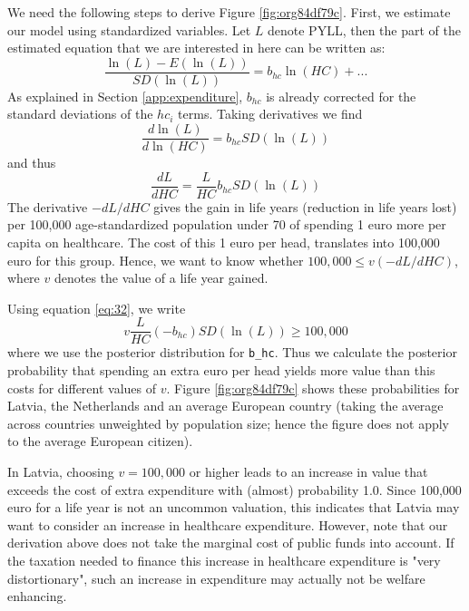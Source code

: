 \documentclass{article}
\begin{document}
We need the following steps to derive Figure \ref{fig:org84df79c}. First, we estimate our model using standardized variables. Let \(L\) denote PYLL, then the part of the estimated equation that we are interested in here can be written as:
\begin{equation}
\label{eq:27}
\frac{\ln(L)-E(\ln(L))}{SD(\ln(L))} = b_{hc} \ln(HC) + ...
\end{equation}
As explained in Section \ref{app:expenditure}, \(b_{hc}\) is already corrected for the standard deviations of the \(hc_i\) terms. Taking derivatives we find
\begin{equation}
\label{eq:31}
\frac{d \ln(L)}{d \ln(HC)} = b_{hc} SD(\ln(L))
\end{equation}
and thus
\begin{equation}
\label{eq:32}
\frac{dL}{dHC} = \frac{L}{HC} b_{hc} SD(\ln(L))
\end{equation}
The derivative \(-dL/dHC\) gives the gain in life years (reduction in life years lost) per 100,000 age-standardized population under 70 of spending 1 euro more per capita on healthcare. The cost of this 1 euro per head, translates into 100,000 euro for this group. Hence, we want to know whether \(100,000 \leq v (-dL/dHC)\), where \(v\) denotes the value of a life year gained. 

Using equation \eqref{eq:32}, we write
\begin{equation}
\label{eq:22}
v \frac{L}{HC} (-b_{hc}) SD(\ln(L)) \geq 100,000
\end{equation}
where we use the posterior distribution for \texttt{b\_hc}. Thus we calculate the posterior probability that spending an extra euro per head yields more value than this costs for different values of \(v\). Figure \ref{fig:org84df79c} shows these probabilities for Latvia, the Netherlands and an average European country (taking the average across countries unweighted by population size; hence the figure does not apply to the average European citizen).

In Latvia, choosing \(v = 100,000\) or higher leads to an increase in value that exceeds the cost of extra expenditure with (almost) probability 1.0. Since 100,000 euro for a life year is not an uncommon valuation, this indicates that Latvia may want to consider an increase in healthcare expenditure. However, note that our derivation above does not take the marginal cost of public funds into account. If the taxation needed to finance this increase in healthcare expenditure is "very distortionary", such an increase in expenditure may actually not be welfare enhancing.
\end{document}
